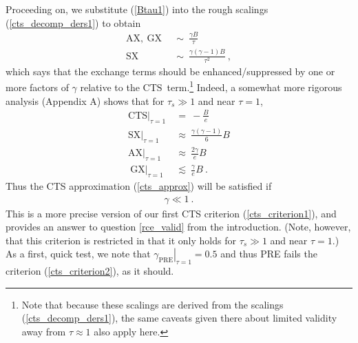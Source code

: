 \documentclass{ametsoc}
\newcommand{\beqn}{\begin{equation}}
\newcommand{\eeqn}{\end{equation}}
\newcommand{\eqnref}[1]{(\ref{#1})}
\newcommand{\taus}{\ensuremath{\tau_s}}
\newcommand{\SX}{\ensuremath{\mathrm{SX}}}
\newcommand{\AX}{\ensuremath{\mathrm{AX}}}
\newcommand{\GX}{\ensuremath{\mathrm{GX}}}
\newcommand{\CTS}{\ensuremath{\mathrm{CTS}}}
\begin{document}
Proceeding on, we substitute \eqnref{Btau1} into the rough scalings \eqnref{cts_decomp_ders1} to obtain 
\begin{subequations}
	\begin{align}
		\AX, \ \GX	 \ & \ \sim \ \frac{\gamma B}{\tau}  \label{ax_gx_scaling}\\
		\SX	 \ & \ \sim \ \frac{\gamma(\gamma-1)B}{\tau^2}  \ , \label{sx_scaling} 
	\end{align}
	\label{cts_decomp_ders2}
\end{subequations}
which says that the exchange terms should be enhanced/suppressed by one or more factors of $\gamma$ relative to the \CTS\ term.\footnote{Note that because these scalings are derived from the scalings \eqnref{cts_decomp_ders1}, the same caveats given there about limited validity away from $\tau\approx 1$ also apply here.} Indeed, a somewhat more rigorous analysis (Appendix A) shows that for $\taus \gg1 $ and near $\tau=1$,
\beqn
	\begin{split}
	 	\CTS|_{\tau=1} & \ = \  - \frac{B}{e}   \\
 		\SX|_{\tau=1} &\ \approx   \ \frac{\gamma(\gamma-1) }{6} B  \\
 		\AX|_{\tau=1} & \ \approx  \   \frac{2\gamma }{ e} B   \\
\		\GX|_{\tau=1} & \ \lesssim  \  \frac{\gamma }{ e } B   \ .
\end{split}
\label{cts_decomp_tau1}
\eeqn
Thus the CTS approximation \eqnref{cts_approx}  will be satisfied if 
\begin{align}
	 \gamma  \ll 1 \ . 
	\label{cts_criterion2}
\end{align}
This is a more precise version of our first CTS criterion \eqnref{cts_criterion1}, and provides an answer to question \ref{rce_valid} from the introduction. (Note, however, that this criterion is restricted in that it only holds for $\taus\gg 1$ and near $\tau=1$.)  As a first, quick test, we note that  $\left. \gamma_{\mathrm{PRE}}\right|_{\tau=1} =  0.5$ and thus PRE fails the criterion \eqnref{cts_criterion2}, as it should.

\end{document}
